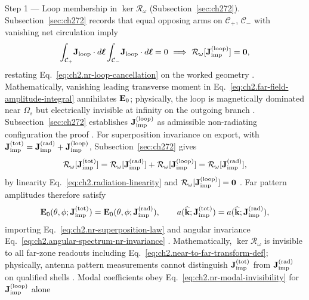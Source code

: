 Step 1 --- Loop membership in \(\ker\mathcal{R}_\omega\) (Subsection~\ref{sec:ch272}). Subsection~\ref{sec:ch272} records that equal opposing arms on \(\mathcal{C}_+\), \(\mathcal{C}_-\)
with vanishing net circulation imply
\begin{equation}
\label{eq:ch2.ex-nr-loop-test}
\int_{\mathcal{C}_+}\!\mathbf{J}_{\mathrm{loop}}\cdot d\boldsymbol{\ell}
\int_{\mathcal{C}_-}\!\mathbf{J}_{\mathrm{loop}}\cdot d\boldsymbol{\ell}
=0
\ \Longrightarrow\
\mathcal{R}_\omega[\mathbf{J}_{\mathrm{imp}}^{(\mathrm{loop})}]=\mathbf{0},
\end{equation}
restating Eq.~\eqref{eq:ch2.nr-loop-cancellation} on the worked geometry \cite{stratton1941}.
Mathematically, vanishing leading transverse moment in
Eq.~\eqref{eq:ch2.far-field-amplitude-integral} annihilates \(\mathbf{E}_0\); physically, the loop is
magnetically dominated near \(\Omega_s\) but electrically invisible at infinity on the outgoing
branch \cite{harrington2001}. Subsection~\ref{sec:ch272} establishes \(\mathbf{J}_{\mathrm{imp}}^{(\mathrm{loop})}\) as admissible non-radiating configuration
the proof \cite{stratton1941}.
For superposition invariance on export, with \(\mathbf{J}_{\mathrm{imp}}^{(\mathrm{tot})}=\mathbf{J}_{\mathrm{imp}}^{(\mathrm{rad})}+\mathbf{J}_{\mathrm{imp}}^{(\mathrm{loop})}\), Subsection~\ref{sec:ch272}
gives
\begin{equation}
\label{eq:ch2.ex-nr-superposition-test}
\mathcal{R}_\omega[\mathbf{J}_{\mathrm{imp}}^{(\mathrm{tot})}]
=
\mathcal{R}_\omega[\mathbf{J}_{\mathrm{imp}}^{(\mathrm{rad})}]+\mathcal{R}_\omega[\mathbf{J}_{\mathrm{imp}}^{(\mathrm{loop})}]
=
\mathcal{R}_\omega[\mathbf{J}_{\mathrm{imp}}^{(\mathrm{rad})}],
\end{equation}
by linearity Eq.~\eqref{eq:ch2.radiation-linearity} and
\(\mathcal{R}_\omega[\mathbf{J}_{\mathrm{imp}}^{(\mathrm{loop})}]=\mathbf{0}\) \cite{stratton1941}. Far
pattern amplitudes therefore satisfy
\begin{equation}
\label{eq:ch2.ex-nr-far-invariance}
\mathbf{E}_0(\theta,\phi;\mathbf{J}_{\mathrm{imp}}^{(\mathrm{tot})})
=
\mathbf{E}_0(\theta,\phi;\mathbf{J}_{\mathrm{imp}}^{(\mathrm{rad})}),
\qquad
a(\widehat{\mathbf{k}};\mathbf{J}_{\mathrm{imp}}^{(\mathrm{tot})})
=
a(\widehat{\mathbf{k}};\mathbf{J}_{\mathrm{imp}}^{(\mathrm{rad})}),
\end{equation}
importing Eq.~\eqref{eq:ch2.nr-superposition-law} and angular invariance
Eq.~\eqref{eq:ch2.angular-spectrum-nr-invariance} \cite{stratton1941}. Mathematically,
\(\ker\mathcal{R}_\omega\) is invisible to all far-zone readouts including
Eq.~\eqref{eq:ch2.near-to-far-transform-def}; physically, antenna pattern measurements cannot
distinguish \(\mathbf{J}_{\mathrm{imp}}^{(\mathrm{tot})}\) from \(\mathbf{J}_{\mathrm{imp}}^{(\mathrm{rad})}\) on qualified shells
\cite{harrington2001}. Modal coefficients obey
Eq.~\eqref{eq:ch2.nr-modal-invisibility} for \(\mathbf{J}_{\mathrm{imp}}^{(\mathrm{loop})}\) alone
